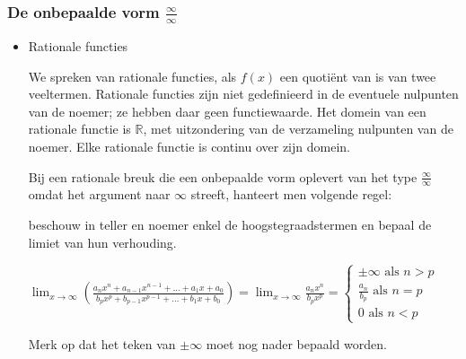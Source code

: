 \subsubsection{De onbepaalde vorm $\frac{\infty}{\infty}$}

\begin{itemize}
\item{Rationale functies}

We spreken van rationale functies, als $f(x)$ een quoti\"ent
van is van twee veeltermen. Rationale functies zijn niet gedefinieerd
in de eventuele nulpunten van de noemer; ze hebben daar geen functiewaarde.
Het domein van een rationale functie is $\mathbb{R}$, met uitzondering
van de verzameling nulpunten van de noemer. Elke rationale functie
is continu over zijn domein.

Bij een rationale breuk die een onbepaalde vorm oplevert
van het type $\frac{\infty}{\infty}$ omdat het argument naar $\infty$
streeft, hanteert men volgende regel: 

beschouw in teller en noemer enkel de hoogstegraadstermen en bepaal
de limiet van hun verhouding.



\begin{math}
{\displaystyle \lim_{x\to\infty}}\left(\frac{a_{n}x^{n}+a_{n-1}x^{n-1}+\ldots+a_{1}x+a_{0}}{b_{p}x^{p}+b_{p-1}x^{p-1}+\ldots+b_{1}x+b_{0}}\right)={\displaystyle \lim_{x\to\infty}}{\displaystyle \frac{a_{n}x^{n}}{b_{p}x^{p}}} = 
\left\{
\begin{array}{l}
\pm\infty \text{ als } n>p \\
\frac{a_n}{b_p} \text{ als } n=p \\
0 \text{ als } n<p
\end{array}
\right.
\end{math}


Merk op dat het teken van $\pm\infty$ moet nog nader bepaald worden.





\end{itemize}
